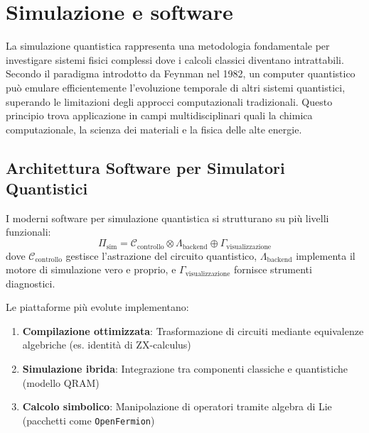 \documentclass[a4paper,12pt]{report}
\theoremstyle{plain}
\begin{document}
\chapter{Simulazione e software}
La simulazione quantistica rappresenta una metodologia fondamentale per investigare sistemi fisici complessi dove i calcoli classici diventano intrattabili. Secondo il paradigma introdotto da Feynman nel 1982, un computer quantistico può emulare efficientemente l'evoluzione temporale di altri sistemi quantistici, superando le limitazioni degli approcci computazionali tradizionali. Questo principio trova applicazione in campi multidisciplinari quali la chimica computazionale, la scienza dei materiali e la fisica delle alte energie.

\section{Architettura Software per Simulatori Quantistici}
I moderni software per simulazione quantistica si strutturano su più livelli funzionali:
\begin{equation}
\Pi_{\text{sim}} = \mathcal{C}_{\text{controllo}} \otimes \Lambda_{\text{backend}} \oplus \Gamma_{\text{visualizzazione}}
\end{equation}
dove $\mathcal{C}_{\text{controllo}}$ gestisce l'astrazione del circuito quantistico, $\Lambda_{\text{backend}}$ implementa il motore di simulazione vero e proprio, e $\Gamma_{\text{visualizzazione}}$ fornisce strumenti diagnostici. 

\vspace{0.2cm}
\noindent Le piattaforme più evolute implementano:
\begin{enumerate}
    \item \textbf{Compilazione ottimizzata}: Trasformazione di circuiti mediante equivalenze algebriche (es. identità di ZX-calculus)
    \item \textbf{Simulazione ibrida}: Integrazione tra componenti classiche e quantistiche (modello QRAM)
    \item \textbf{Calcolo simbolico}: Manipolazione di operatori tramite algebra di Lie (pacchetti come \texttt{OpenFermion})
\end{enumerate}
\end{document}
